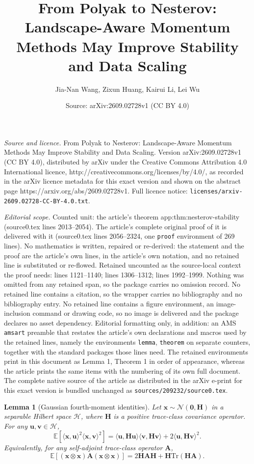 \documentclass[10pt,a4paper]{amsart}
\title{From Polyak to Nesterov: Landscape-Aware Momentum Methods May Improve Stability and Data Scaling}
\author{Jia-Nan Wang, Zixun Huang, Kairui Li, Lei Wu}
\date{Source: arXiv:2609.02728v1 (CC BY 4.0)}
\newtheorem{lemma}{Lemma}
\newcommand{\EE}{\mathbb{E}}
\newcommand{\Tr}{\mathrm{Tr}}
\newcommand{\bA}{\fbf{A}}
\newcommand{\bH}{\fbf{H}}
\newcommand{\bu}{\fbf{u}}
\newcommand{\bv}{\fbf{v}}
\newcommand{\bx}{\fbf{x}}
\newcommand{\fbf}[1]{\mathbf{#1}}
\begin{document}
\maketitle

\noindent\emph{Source and licence.} From Polyak to Nesterov: Landscape-Aware Momentum Methods May Improve Stability and Data Scaling. Version arXiv:2609.02728v1 (CC BY 4.0), distributed by arXiv under the Creative Commons Attribution 4.0 International licence, http://creativecommons.org/licenses/by/4.0/, as recorded in the arXiv licence metadata for this exact version and shown on the abstract page https://arxiv.org/abs/2609.02728v1. Full licence notice: \texttt{licenses/arxiv-2609.02728-CC-BY-4.0.txt}.\par\smallskip

\noindent\textit{Editorial scope.} Counted unit: the article's theorem app:thm:nesterov-stability (source0.tex lines 2013--2054). The article's complete original proof of it is delivered with it (source0.tex lines 2056--2324, one \texttt{proof} environment of 269 lines). No mathematics is written, repaired or re-derived: the statement and the proof are the article's own lines, in the article's own notation, and no retained line is substituted or re-flowed.  Retained uncounted as the source-local context the proof needs: lines 1121--1140; lines 1306--1312; lines 1992--1999.  Nothing was omitted from any retained span, so the package carries no omission record.  No retained line contains a citation, so the wrapper carries no bibliography and no bibliography entry.  No retained line contains a figure environment, an image-inclusion command or drawing code, so no image is delivered and the package declares no asset dependency.  Editorial formatting only, in addition: an AMS \texttt{amsart} preamble that restates the article's own declarations and macros used by the retained lines, namely the environments \texttt{lemma}, \texttt{theorem} on separate counters, together with the standard packages those lines need.  The retained environments print in this document as Lemma 1, Theorem 1 in order of appearance, whereas the article prints the same items with the numbering of its own full document.  The complete native source of the article as distributed in the arXiv e-print for this exact version is bundled unchanged as \texttt{sources/209232/source0.tex}.
\begin{lemma}[Gaussian fourth-moment identities]
\label{app:lem:gaussian-fourth-moment}
Let \(\bx\sim\mathcal N(\bm0,\bH)\) in a separable Hilbert space \(\mathcal H\), where \(\bH\) is a positive trace-class covariance operator. For any \(\bu,\bv\in\mathcal H\),
\begin{equation}
\label{app:eq:gaussian-fourth-moment-directional}
\EE\!\left[\langle\bx,\bu\rangle^2\langle\bx,\bv\rangle^2\right]
=
\langle\bu,\bH\bu\rangle\langle\bv,\bH\bv\rangle
+
2\langle\bu,\bH\bv\rangle^2.
\end{equation}
Equivalently, for any self-adjoint trace-class operator \(\bA\),
\begin{equation}
\label{app:eq:gaussian-fourth-moment}
\EE\!\left[(\bx\otimes\bx)\bA(\bx\otimes\bx)\right]
=
2\bH\bA\bH+\bH\Tr(\bH\bA).
\end{equation}
% 
\end{lemma}
\end{document}
